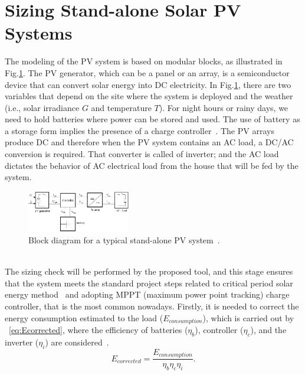 \documentclass[10pt,conference]{IEEEtran}
\begin{document}
\section{Sizing Stand-alone Solar PV Systems}
\label{sec:sizing}
The modeling of the PV system is based on modular blocks, as illustrated in Fig.\ref{fig:blockdiagram}. %
The PV generator, which can be a panel or an array, is a semiconductor device that can convert solar energy into DC electricity. In Fig.\ref{fig:blockdiagram}, there are two variables that depend on the site where the system is deployed and the weather (i.e., solar irradiance $G$ and temperature $T$). For night hours or rainy days, we need to hold batteries where power can be stored and used. The use of battery as a storage form implies the presence of a charge controller~\cite{Hansen}. The PV arrays produce DC and therefore when the PV system contains an AC load, a DC/AC conversion is required. That converter is called of inverter; and the AC load dictates the behavior of AC electrical load from the house that will be fed by the system.
\begin{figure}[h]
\includegraphics[width=0.4\textwidth]{blockdiagramPVS2}
\centering
\caption{Block diagram for a typical stand-alone PV system~\cite{Hansen}.}
\label{fig:blockdiagram} 
\end{figure}
\\

The sizing check will be performed by the proposed tool, and this stage ensures that the system meets the standard project steps related to critical period solar energy method~\cite{Pinho} and adopting MPPT (maximum power point tracking) charge controller, that is the most common nowadays. 
%
Firstly, it is needed to correct the energy consumption estimated to the load ($E_{consumption}$), which is carried out by ~\eqref{eq:Ecorrected}, where the efficiency of batteries ($\eta_{b}$), controller ($\eta_{c}$), and the inverter ($\eta_{i}$) are considered~\cite{Pinho}.
\begin{equation}
\label{eq:Ecorrected}
\scriptstyle E_{corrected} = \dfrac{\scriptstyle E_{consumption}}{ \scriptstyle \eta_{b} \eta_{c} \eta_{i} }.
\end{equation}
\end{document}
